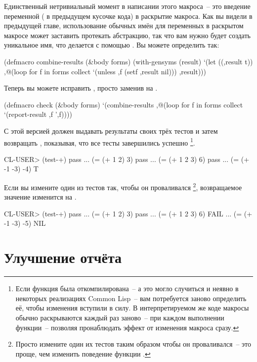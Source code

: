 Единственный нетривиальный момент в написании этого макроса~-- это введение переменной
( в предыдущем кусочке кода) в раскрытие макроса. Как вы видели в предыдущей
главе, использование обычных имён для переменных в раскрытом макросе может заставить
протекать абстракцию, так что вам нужно будет создать уникальное имя, что делается с
помощью . Вы можете определить  так:

\begin{myverb}
(defmacro combine-results (&body forms)
  (with-gensyms (result)
    `(let ((,result t))
      ,@(loop for f in forms collect `(unless ,f (setf ,result nil)))
      ,result)))
\end{myverb}

Теперь вы можете исправить , просто заменив  на
.

\begin{myverb}
(defmacro check (&body forms)
  `(combine-results
    ,@(loop for f in forms collect `(report-result ,f ',f))))
\end{myverb}

С этой версией   должен выдавать результаты своих трёх тестов и
затем возвращать , показывая, что все тесты завершились успешно \footnote{Если
  функция  была откомпилирована~-- а это могло случиться и неявно в
  некоторых реализациях Common Lisp~-- вам потребуется заново определить её, чтобы
  изменения вступили в силу. В интерпретируемом же коде макросы обычно раскрываются каждый
  раз заново~-- при каждом выполнении функции~-- позволяя пронаблюдать эффект от
  изменения макроса сразу.}.

\begin{myverb}
CL-USER> (test-+)
pass ... (= (+ 1 2) 3)
pass ... (= (+ 1 2 3) 6)
pass ... (= (+ -1 -3) -4)
T
\end{myverb}

Если вы измените один из тестов так, чтобы он проваливался \footnote{Просто измените один
  их тестов таким образом чтобы он проваливался~-- это проще, чем изменить поведение
  функции \code{+}.}, возвращаемое значение изменится на .

\begin{myverb}
CL-USER> (test-+)
pass ... (= (+ 1 2) 3)
pass ... (= (+ 1 2 3) 6)
FAIL ... (= (+ -1 -3) -5)
NIL
\end{myverb}

\section{Улучшение отчёта}


